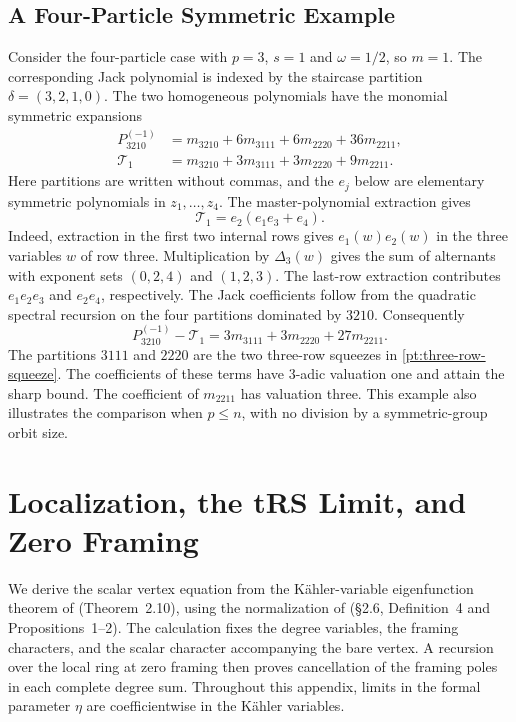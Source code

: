 \documentclass[11pt]{amsart}
\theoremstyle{definition}
\theoremstyle{remark}
\numberwithin{equation}{section}
\begin{document}
\subsection{A Four-Particle Symmetric Example}
Consider the four-particle case with $p=3$, $s=1$ and
$\omega=1/2$, so $m=1$. The corresponding Jack polynomial
is indexed by the staircase partition $\delta=(3,2,1,0)$.
The two homogeneous polynomials have the monomial symmetric
expansions
\begin{align*}
 P_{3210}^{(-1)}
 &=m_{3210}+6m_{3111}+6m_{2220}+36m_{2211},\\
 \mathcal T_1
 &=m_{3210}+3m_{3111}+3m_{2220}+9m_{2211}.
\end{align*}
Here partitions are written without commas, and the $e_j$ below
are elementary symmetric polynomials in $z_1,\ldots,z_4$.
The master-polynomial extraction gives
\[
 \mathcal T_1=e_2(e_1e_3+e_4).
\]
Indeed, extraction in the first two internal rows gives
$e_1(w)e_2(w)$ in the three variables $w$ of row three.
Multiplication by $\Delta_3(w)$ gives the sum of alternants
with exponent sets $(0,2,4)$ and $(1,2,3)$. The last-row
extraction contributes $e_1e_2e_3$ and $e_2e_4$, respectively.
The Jack coefficients follow from the quadratic spectral
recursion on the four partitions dominated by $3210$.
Consequently
\begin{equation}\label{ex:rank-four-jack}
 P_{3210}^{(-1)}-\mathcal T_1
 =3m_{3111}+3m_{2220}+27m_{2211}.
\end{equation}
The partitions $3111$ and $2220$ are the two three-row
squeezes in \eqref{pt:three-row-squeeze}. The coefficients
of these terms have $3$-adic valuation one and attain the
sharp bound. The coefficient of $m_{2211}$ has valuation
three. This example also illustrates the comparison when
$p\leq n$, with no division by a symmetric-group orbit size.

\appendix

\section{Localization, the tRS Limit, and Zero Framing}
\label{dg:section}
We derive the scalar vertex equation from the K\"ahler-variable
eigenfunction theorem of \cite{K21} (Theorem~2.10), using the
normalization of \cite{Din21} (\S2.6, Definition~4 and
Propositions~1--2). The calculation fixes the degree variables,
the framing characters, and the scalar character accompanying the
bare vertex. A recursion over the local ring at zero framing then
proves cancellation of the framing poles in each complete degree
sum. Throughout this appendix, limits in the formal parameter
$\eta$ are coefficientwise in the K\"ahler variables.
\end{document}
